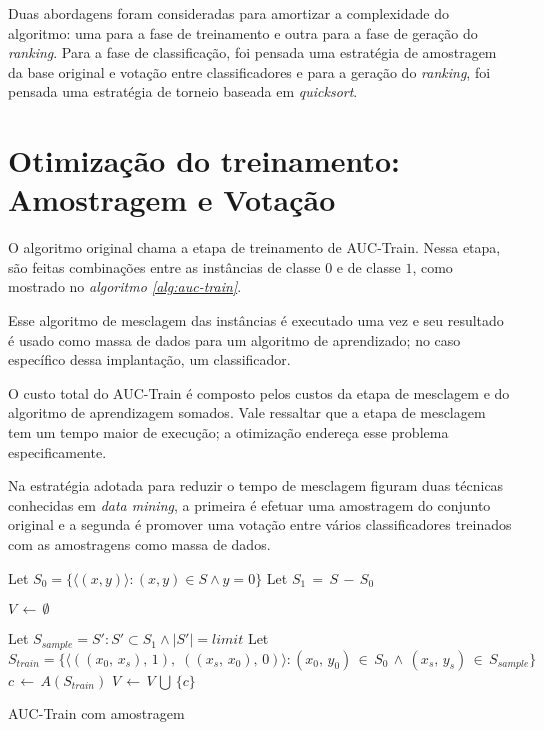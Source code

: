 Duas abordagens foram consideradas para amortizar a complexidade do algoritmo: uma para a fase de treinamento e outra para a fase de geração do \emph{ranking}. Para a fase de classificação, foi pensada uma estratégia de amostragem da base original e votação entre classificadores e para a geração do \emph{ranking}, foi pensada uma estratégia de torneio baseada em \emph{quicksort}.

\section{Otimização do treinamento: Amostragem e Votação}
O algoritmo original chama a etapa de treinamento de AUC-Train. Nessa etapa, são feitas combinações entre as instâncias de classe $0$ e de classe $1$, como mostrado no \emph{algoritmo \ref{alg:auc-train}}.

Esse algoritmo de mesclagem das instâncias é executado uma vez e seu resultado é usado como massa de dados para um algoritmo de aprendizado; no caso específico dessa implantação, um classificador.

O custo total do AUC-Train é composto pelos custos da etapa de mesclagem e do algoritmo de aprendizagem somados. Vale ressaltar que a etapa de mesclagem tem um tempo maior de execução; a otimização endereça esse problema especificamente.

Na estratégia adotada para reduzir o tempo de mesclagem figuram duas técnicas conhecidas em \emph{data mining}, a primeira é efetuar uma amostragem do conjunto original e a segunda é promover uma votação entre vários classificadores treinados com as amostragens como massa de dados.

\begin{algorithm}
\begin{algorithmic}

\STATE Let $S_0 = \{\langle (x, y) \rangle: (x, y) \in S \wedge y = 0\}$
\STATE Let $S_1\,=\,S\,-\,S_0$

\STATE $V\,\gets\,\emptyset$

\STATE Let $S_{sample} = S' : S' \subset S_1 \wedge |S'| = limit$
\STATE Let $S_{train} = \{\langle ((x_{0},\,x_{s}),\, 1),\; ((x_{s},\, x_{0}),\,0) \rangle:
       (x_{0},\,y_{0})\,\in\,S_{0}\,\wedge\,
       (x_{s},\,y_{s})\,\in\,S_{sample}\}$
\STATE $c\,\gets\,A(S_{train})$
\STATE $V\,\gets\,V\,\bigcup\,\{c\}$
\ENDFOR

\caption{AUC-Train com amostragem}
\label{alg:auc-train-amostragem-votacao}

\end{algorithmic}
\end{algorithm}


